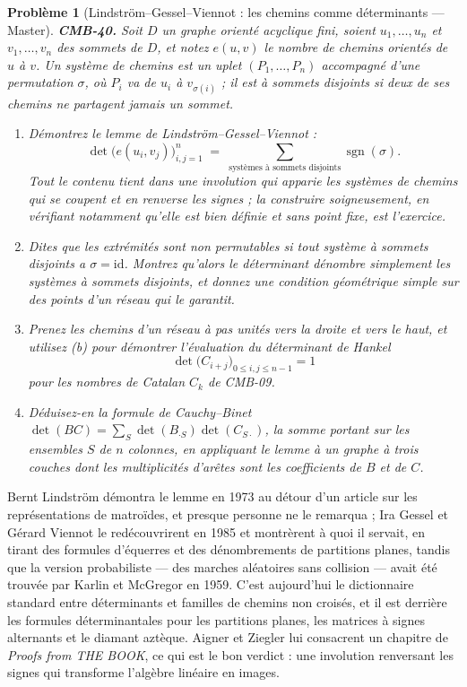 \documentclass[11pt]{article}
\newtheorem{problem}{Problème}
\begin{document}
\begin{problem}[{Lindström--Gessel--Viennot : les chemins comme déterminants --- Master}]
\textbf{CMB-40.} Soit $ D $ un graphe orienté acyclique fini, soient $ u_1,\dots,u_n $ et $ v_1,\dots,v_n $ des sommets de $ D $, et notez $ e(u,v) $ le nombre de chemins orientés de $ u $ à $ v $. Un \textit{système de chemins} est un uplet $ (P_1,\dots,P_n) $ accompagné d'une permutation $ \sigma $, où $ P_i $ va de $ u_i $ à $ v_{\sigma(i)} $ ; il est \textit{à sommets disjoints} si deux de ses chemins ne partagent jamais un sommet.
\begin{enumerate}
\item[(a)] Démontrez le lemme de Lindström--Gessel--Viennot :
\[ \det\big( e(u_i, v_j) \big)_{i,j=1}^{n} \;=\; \sum_{\text{systèmes à sommets disjoints}} \operatorname{sgn}(\sigma). \]
Tout le contenu tient dans une involution qui apparie les systèmes de chemins qui se coupent et en renverse les signes ; la construire soigneusement, en vérifiant notamment qu'elle est bien définie et sans point fixe, est l'exercice.
\item[(b)] Dites que les extrémités sont \textit{non permutables} si tout système à sommets disjoints a $ \sigma = \mathrm{id} $. Montrez qu'alors le déterminant dénombre simplement les systèmes à sommets disjoints, et donnez une condition géométrique simple sur des points d'un réseau qui le garantit.
\item[(c)] Prenez les chemins d'un réseau à pas unités vers la droite et vers le haut, et utilisez (b) pour démontrer l'évaluation du déterminant de Hankel
\[ \det\big( C_{i+j} \big)_{0 \le i,j \le n-1} = 1 \]
pour les nombres de Catalan $ C_k $ de CMB-09.
\item[(d)] Déduisez-en la formule de Cauchy--Binet $ \det(BC) = \sum_{S} \det(B_{\cdot S}) \det(C_{S \cdot}) $, la somme portant sur les ensembles $ S $ de $ n $ colonnes, en appliquant le lemme à un graphe à trois couches dont les multiplicités d'arêtes sont les coefficients de $ B $ et de $ C $.
\end{enumerate}

\end{problem}

\noindent Bernt Lindström démontra le lemme en 1973 au détour d'un article sur les représentations de matroïdes, et presque personne ne le remarqua ; Ira Gessel et Gérard Viennot le redécouvrirent en 1985 et montrèrent à quoi il servait, en tirant des formules d'équerres et des dénombrements de partitions planes, tandis que la version probabiliste --- des marches aléatoires sans collision --- avait été trouvée par Karlin et McGregor en 1959. C'est aujourd'hui le dictionnaire standard entre déterminants et familles de chemins non croisés, et il est derrière les formules déterminantales pour les partitions planes, les matrices à signes alternants et le diamant aztèque. Aigner et Ziegler lui consacrent un chapitre de \textit{Proofs from THE BOOK}, ce qui est le bon verdict : une involution renversant les signes qui transforme l'algèbre linéaire en images.
\end{document}
